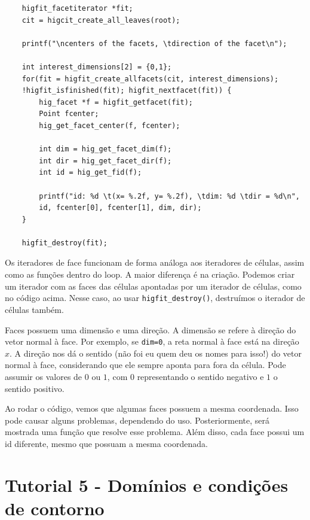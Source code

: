 \begin{verbatim}
	higfit_facetiterator *fit; 
    cit = higcit_create_all_leaves(root); 

    printf("\ncenters of the facets, \tdirection of the facet\n");

    int interest_dimensions[2] = {0,1};
    for(fit = higfit_create_allfacets(cit, interest_dimensions); 
	!higfit_isfinished(fit); higfit_nextfacet(fit)) {
        hig_facet *f = higfit_getfacet(fit);
        Point fcenter;
        hig_get_facet_center(f, fcenter);

        int dim = hig_get_facet_dim(f);
        int dir = hig_get_facet_dir(f);
        int id = hig_get_fid(f);

        printf("id: %d \t(x= %.2f, y= %.2f), \tdim: %d \tdir = %d\n", 
		id, fcenter[0], fcenter[1], dim, dir);
    }

    higfit_destroy(fit);
\end{verbatim}

Os iteradores de face funcionam de forma análoga aos iteradores de células, assim como as funções dentro do loop. A maior diferença é na criação. Podemos criar um iterador com as faces das células apontadas por um iterador de células, como no código acima. Nesse caso, ao usar \texttt{higfit\_destroy()}, destruímos o iterador de células também.

Faces possuem uma dimensão e uma direção. A dimensão se refere à direção do vetor normal à face. Por exemplo, se \texttt{dim=0}, a reta normal à face está na direção $x$. A direção nos dá o sentido (não foi eu quem deu os nomes para isso!) do vetor normal à face, considerando que ele sempre aponta para fora da célula. Pode assumir os valores de $0$ ou $1$, com $0$ representando o sentido negativo e $1$ o sentido positivo.

Ao rodar o código, vemos que algumas faces possuem a mesma coordenada. Isso pode causar alguns problemas, dependendo do uso. Posteriormente, será mostrada uma função que resolve esse problema. Além disso, cada face possui um id diferente, mesmo que possuam a mesma coordenada.


\section{Tutorial 5 - Domínios e condições de contorno}

